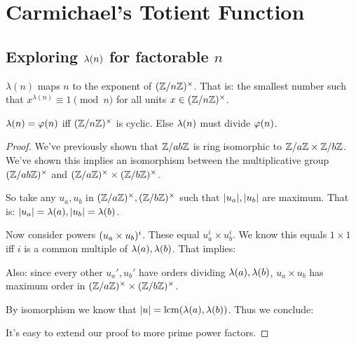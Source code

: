 \section{Carmichael's Totient Function}

\subsection{Exploring $\lambdaf{n}$ for factorable $n$}


\begin{definition}
   $\lambda(n)$ maps $n$ to the
  exponent of $\Zmodnx$. That is: the smallest number such that
  $x^{\lambda(n)} \equiv 1 \pmod{n}$ for all units $x \in \Zmodnx$.
\end{definition}

\begin{proposition}
  $\lambdaf{n} = \vphif{n}$ iff $\Zmodnx$ is cyclic. Else $\lambdaf{n}$
  must divide $\vphif{n}$.
\end{proposition}

\begin{theorem}

  \begin{nedqn}
  \eqcol
    \lcm{}
  \end{nedqn}
\end{theorem}

\begin{proof}
  We've previously shown that $\Zmod{ab}$ is ring isomorphic to
  $\Zmod{a} \times \Zmod{b}$. We've shown this implies an isomorphism
  between the multiplicative group $\Zmodx{ab}$ and $\Zmodax \times
  \Zmodbx$.

  So take any $u_a, u_b$ in $\Zmodax, \Zmodbx$ such that $\order{u_a},
  \order{u_b}$ are maximum. That is: $\order{u_a} = \lambdaf{a},
  \order{u_b} = \lambdaf{b}$.

  Now consider powers $\parens{u_a \times u_b}^i$. These equal $u_a^i
  \times u_b^i$. We know this equals $1 \times 1$ iff $i$ is a common
  multiple of $\lambdaf{a}, \lambdaf{b}$. That implies:

  \begin{nedqn}
  \eqcol
  \end{nedqn}

  Also: since every other $u_a', u_b'$ have orders dividing
  $\lambdaf{a}, \lambdaf{b}$, $u_a \times u_b$ has maximum order in
  $\Zmodax \times \Zmodbx$.

  By isomorphism we know that $\order{u} = \lcmf{\lambdaf{a},
  \lambdaf{b}}$. Thus we conclude:

  \begin{nedqn}
  \eqcol
  \end{nedqn}

  It's easy to extend our proof to more prime power factors.
\end{proof}
